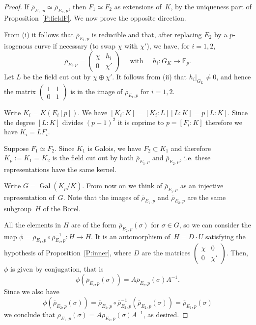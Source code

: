 \documentclass[12pt, reqno]{amsart}
\newcommand{\Fp}{\mathbb{F}_p}
\newcommand{\rhobar}{{\overline{\rho}}}
\DeclareMathOperator{\Gal}{Gal}
\numberwithin{equation}{section}
\theoremstyle{definition}
\theoremstyle{remark}
\begin{document}
\begin{proof}
  If $\rhobar_{E_1,p} \simeq \rhobar_{E_2,p}$, then $F_1 \simeq F_2$
  as extensions of~$K$, by the uniqueness part of
  Proposition~\ref{P:fieldF}. We now prove the opposite direction.

From (i) it follows that $\rhobar_{E_i,p}$ is reducible and that,
after replacing $E_2$ by a $p$-isogenous curve if necessary (to swap
$\chi$ with $\chi'$), we have, for $i=1,2$,
\[
\rhobar_{E_i,p} =  \begin{pmatrix}
                            \chi & h_i \\
                            0 & \chi'
                            \end{pmatrix} \quad \text{ with } \quad  h_i : G_K \to \Fp.  
\]
Let $L$ be the field cut out 
by $\chi \oplus \chi'$. 
It follows from (ii) that $h_i|_{G_L} \neq 0$, and
hence the matrix $\left(\begin{smallmatrix}
                            1 & 1 \\
                            0 & 1
                            \end{smallmatrix} \right)$  
is in the image of $\rhobar_{E_i,p}$ for $i=1,2$.
                            
Write $K_i = K(E_i[p])$. 
We have $[K_i : K] = [K_i : L][L : K] = p [L : K]$. 
Since the degree $[L : K]$ divides $(p-1)^2$ it is coprime 
to $p = [F_i : K]$ therefore we have $K_i = L F_i$.

Suppose $F_1 \simeq F_2$. Since $K_1$ is Galois, we have $F_2 \subset K_1$ and therefore $K_p := K_1 = K_2$ is the field cut out by both
$\rhobar_{E_1,p}$ and $\rhobar_{E_2,p}$, i.e. these representations have the same kernel.

Write $G = \Gal(K_p / K)$. From now on we think of $\rhobar_{E_i,p}$ as an injective representation of~$G$. Note that the images of $\rhobar_{E_1,p}$ and $\rhobar_{E_2,p}$
are the same subgroup~$H$ of the Borel.

All the elements in $H$ are of the form $\rhobar_{E_2,p}(\sigma)$ for $\sigma \in G$, so we can consider the map $\phi = \rhobar_{E_1,p} \circ \rhobar_{E_2,p}^{-1} : H \to H$. It is an automorphism of~$H = D\cdot U$ satisfying the hypothesis of Proposition~\ref{P:inner}, where $D$ are 
the matrices $\left(\begin{smallmatrix}
                            \chi & 0 \\
                            0 & \chi'
                            \end{smallmatrix} \right)$.  
Then, $\phi$ is given by conjugation, that is
\[
 \phi(\rhobar_{E_2,p}(\sigma)) = A \rhobar_{E_2,p}(\sigma) A^{-1}.
\]
Since we also have
\[ 
\phi(\rhobar_{E_2,p}(\sigma)) 
=  \rhobar_{E_1,p} \circ \rhobar_{E_2,p}^{-1}(\rhobar_{E_2,p}(\sigma)) = \rhobar_{E_1,p}(\sigma)
\]
we conclude that $\rhobar_{E_1,p}(\sigma) = A \rhobar_{E_2,p}(\sigma) A^{-1}$, as desired.
\end{proof}
\end{document}
